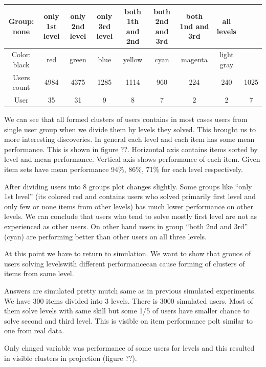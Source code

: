 \documentclass[
  digital, %
  table,   %
  nolof,     %
  nolot,     %
  nocover
]{fithesis3}
\begin{document}
\begin{center}
  \begin{tabular}{|c|c c c c c c c c|}
    \hline
    Group: none & only 1st level & only 2nd level & only 3rd level & both 1th and 2nd & both 2nd and 3rd & both 1nd and 3rd & all levels \\
    \hline
    Color: black & red & green & blue & yellow & cyan & magenta & light gray \\
    \hline
    Users count & 4984 & 4375 & 1285 & 1114 & 960 & 224 & 240 & 1025 \\
    \hline
    User & 35 & 31 & 9 & 8 & 7 & 2 & 2 & 7 \\
    \hline
  \end{tabular}
\end{center}

We can see that all formed clusters of users contains in most cases users
from single user group when we divide them by levels they solved. This
brought us to more interesting discoveries. In general each level and
each item has some mean performance. This is shown in figure ??.
Horizontal axis contains items sorted by level and mean performance.
Vertical axis shows performance of each item. Given item sets have mean
performance 94\%, 86\%, 71\% for each level respectively.

After dividing users into 8 groups plot changes slightly. Some groups
like ``only 1st level'' (its colored red and contains users who solved
primarily first level and only few or none items from other levels) has
much lower performance on other levels. We can conclude that users who
tend to solve mostly first level are not as experienced as other users. On
other hand users in group ``both 2nd and 3rd'' (cyan) are performing
better than other users on all three levels.

At this point we have to return to simulation. We want to show that
grouos of users solving levelswith different performancecan cause
forming of clusters of items from same level.

Answers are simulated pretty mutch same as in previous simulated
experiments. We have 300 items divided into 3 levels. There is 3000
simulated users. Most of them solve levels with same skill but some 1/5
of users have smaller chance to solve second and third level. This is
visible on item performance polt similar to one from real data.

Only chnged variable was performance of some users for levels and this
resulted in visible clusters in projection (figure ??).
\end{document}
